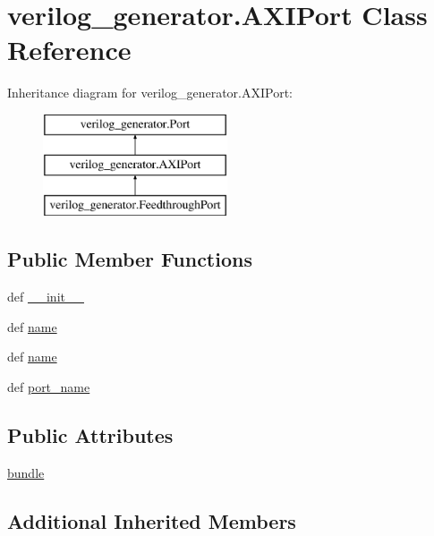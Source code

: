 \hypertarget{classverilog__generator_1_1AXIPort}{\section{verilog\-\_\-generator.\-A\-X\-I\-Port Class Reference}
\label{classverilog__generator_1_1AXIPort}
}
Inheritance diagram for verilog\-\_\-generator.\-A\-X\-I\-Port\-:\begin{figure}[H]
\begin{center}
\leavevmode
\includegraphics[height=3.000000cm]{classverilog__generator_1_1AXIPort}
\end{center}
\end{figure}
\subsection*{Public Member Functions}
\begin{DoxyCompactItemize}
\item 
def \hyperlink{classverilog__generator_1_1AXIPort_a361d2bda856fc56834185a84a380cda4}{\-\_\-\-\_\-init\-\_\-\-\_\-}
\item 
def \hyperlink{classverilog__generator_1_1AXIPort_af08a76ecfd4a6978c60888ef47f39309}{name}
\item 
def \hyperlink{classverilog__generator_1_1AXIPort_af08a76ecfd4a6978c60888ef47f39309}{name}
\item 
def \hyperlink{classverilog__generator_1_1AXIPort_ae3017dd2386c7e09cbf6b79a569bf471}{port\-\_\-name}
\end{DoxyCompactItemize}
\subsection*{Public Attributes}
\begin{DoxyCompactItemize}
\item 
\hyperlink{classverilog__generator_1_1AXIPort_a12216f6df7bee0b17bda71de5843b476}{bundle}
\end{DoxyCompactItemize}
\subsection*{Additional Inherited Members}


